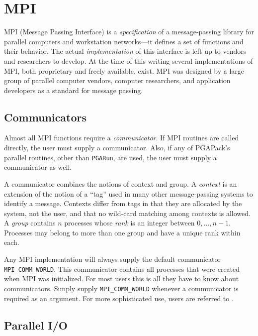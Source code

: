 \documentclass{report}
\newcommand{\pga}{PGAPack}
\begin{document}
\section*{MPI}


MPI (Message Passing Interface) is a {\em specification} of a message-passing
library for parallel computers and workstation networks---it defines a set of
functions and their behavior.  The actual {\em implementation} of this
interface is left up to vendors and researchers to develop.  At the time of
this writing several implementations of MPI, both proprietary and freely
available, exist.  MPI was designed by a large group of parallel computer
vendors, computer researchers, and application developers as a standard for
message passing.

\subsection*{Communicators}

Almost all MPI functions require a {\em communicator}.  If MPI routines are
called directly, the user must supply a communicator.  Also, if any of \pga's
parallel routines, other than {\tt PGARun}, are used, the user must supply a
communicator as well.

A communicator combines the notions of context and group.  A {\em context} is
an extension of the notion of a ``tag'' used in many other message-passing
systems to identify a message.  Contexts differ from tags in that they are
allocated by the system, not the user, and that no wild-card matching among
contexts is allowed.  A {\em group} contains $n$ processes whose {\em rank} is
an integer between $0,\ldots,n-1$.  Processes may belong to more than one
group and have a unique rank within each.

Any MPI implementation will always supply the default communicator {\tt
MPI\_COMM\_WORLD}.  This communicator contains all processes that were created
when MPI was initialized.  For most users this is all they have to know about
communicators.  Simply supply {\tt MPI\_COMM\_WORLD} whenever a communicator
is required as an argument.  For more sophisticated use, users are referred to
\cite{MPI-final,GrLuSk94}.



\subsection*{Parallel I/O}
\end{document}
